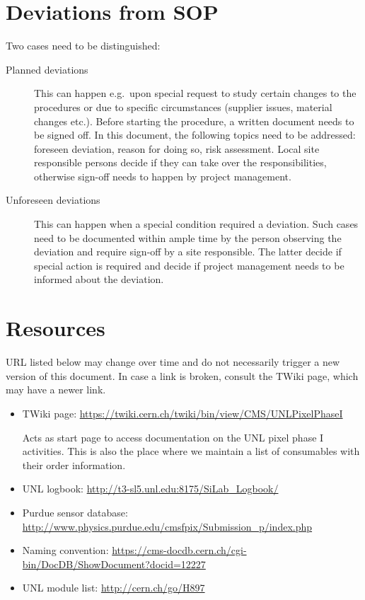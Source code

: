 \documentclass[12pt]{unlsilabsop}
\begin{document}
\section{Deviations from SOP}
Two cases need to be distinguished:
\begin{description}
    \item[Planned deviations] This can happen e.g.~upon special request to study certain changes to the procedures or due to specific circumstances (supplier issues, material changes etc.). Before starting the procedure, a written document needs to be signed off. In this document, the following topics need to be addressed: foreseen deviation, reason for doing so, risk assessment. Local site responsible persons decide if they can take over the responsibilities, otherwise sign-off needs to happen by project management.
    \item[Unforeseen deviations] This can happen when a special condition required a deviation. Such cases need to be documented within ample time by the person observing the deviation and require sign-off by a site responsible. The latter decide if special action is required and decide if project management needs to be informed about the deviation.
\end{description}

\section{Resources} \label{sec:resources}
URL listed below may change over time and do not necessarily trigger a new version of this document. In case a link is broken, consult the TWiki page, which may have a newer link.
\begin{itemize}
    \item TWiki page: \url{https://twiki.cern.ch/twiki/bin/view/CMS/UNLPixelPhaseI}

    Acts as start page to access documentation on the UNL pixel phase I activities. This is also the place where we maintain a list of consumables with their order information.
    \item UNL logbook: \url{http://t3-sl5.unl.edu:8175/SiLab_Logbook/}
    \item Purdue sensor database: \url{http://www.physics.purdue.edu/cmsfpix/Submission_p/index.php}
    \item Naming convention: \url{https://cms-docdb.cern.ch/cgi-bin/DocDB/ShowDocument?docid=12227}
    \item UNL module list: \url{http://cern.ch/go/H897}
\end{itemize}
\end{document}
